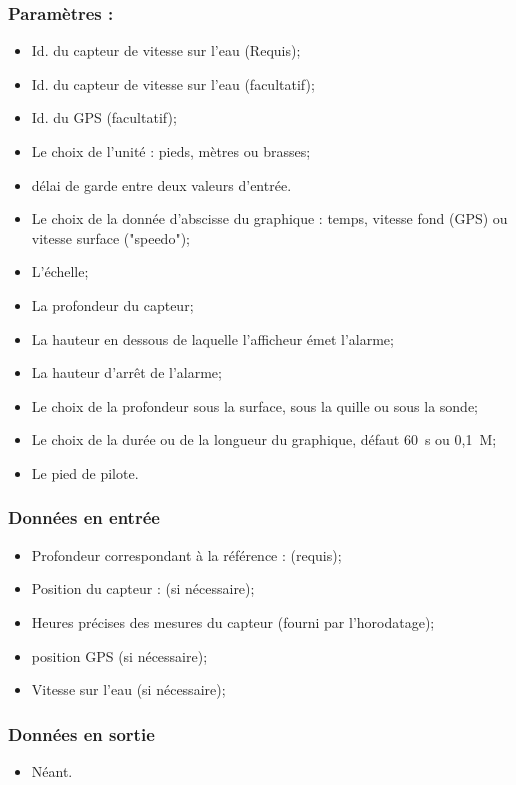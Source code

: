 \documentclass[a4paper,11pt]{report}
\begin{document}
\subsubsection{ Paramètres :}
\begin{itemize}
	\item Id. du capteur de vitesse sur l'eau (Requis);
	\item Id. du capteur de vitesse sur l'eau (facultatif);
	\item Id. du GPS (facultatif);
	\item Le choix de l'unité : pieds, mètres ou brasses;
	\item délai de garde entre deux valeurs d'entrée.
	\item Le choix de la donnée d'abscisse du graphique : temps, vitesse fond (GPS) ou vitesse surface ("speedo");
	\item L'échelle;
	\item La profondeur du capteur;
	\item La hauteur en dessous de laquelle l'afficheur émet l'alarme;
	\item La hauteur d'arrêt de l'alarme;
	\item Le choix de la profondeur sous la surface, sous la quille ou sous la sonde;
	\item Le choix de la durée ou de la longueur du graphique, défaut 60~s ou 0,1~M;
	\item Le pied de pilote.
\end{itemize}

\subsubsection{Données en entrée}
\begin{itemize}
	\item Profondeur correspondant à la référence : (requis);
	\item Position du capteur : (si nécessaire);
	\item Heures précises des mesures du capteur (fourni par l'horodatage);
	\item position GPS (si nécessaire);
	\item Vitesse sur l'eau (si nécessaire);
\end{itemize}

\subsubsection{Données en sortie}
\begin{itemize}
	\item Néant.
\end{itemize}
\end{document}

